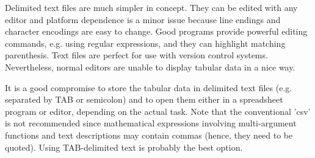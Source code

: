 \documentclass[onecolumn]{article}
\begin{document}
Delimited text files are much simpler in concept. They can be edited with any editor and platform dependence is a minor issue because line endings and character encodings are easy to change. Good programs provide powerful editing commands, e.g. using regular expressions, and they can highlight matching parenthesis. Text files are perfect for use with version control systems. Nevertheless, normal editors are unable to display tabular data in a nice way.

It is a good compromise to store the tabular data in delimited text files (e.g. separated by TAB or semicolon) and to open them either in a spreadsheet program or editor, depending on the actual task. Note that the conventional 'csv' is not recommended since mathematical expressions involving multi-argument functions and text descriptions may contain commas (hence, they need to be quoted). Using TAB-delimited text is probably the best option.
\end{document}
